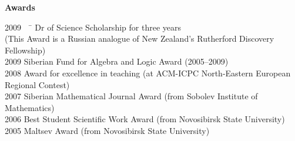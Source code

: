 \documentclass[12pt]{article}
\begin{document}
\centerline{\bf Awards}
\begin{tabbing}
2009 \ \ \=        \> Dr of Science Scholarship for three years\\ 
           \> (This Award is a Russian analogue of New Zealand's Rutherford Discovery Fellowship) \\
2009       \> Siberian Fund for Algebra and Logic Award (2005--2009)\\
2008       \> Award for excellence in teaching (at ACM-ICPC North-Eastern European Regional Contest)\\
2007       \> Siberian Mathematical Journal Award (from Sobolev Institute of Mathematics)\\
2006       \> Best Student Scientific Work Award (from Novosibirsk State University)\\
2005       \> Maltsev Award (from Novosibirsk State University)\\
\end{tabbing}
\end{document}
